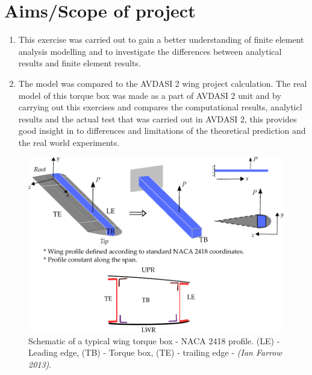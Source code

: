 \documentclass[11pt,a4paper,oneside]{memoir}
\begin{document}
\section{Aims/Scope of project}
\begin{enumerate}
	\item This exercise was carried out to gain a better understanding of finite element analysis modelling and to investigate the differences between analytical results and finite element results. 
	\item The model was compared to the AVDASI 2 wing project calculation. The real model of this torque box was made as a part of AVDASI 2 unit and by carrying out this exercises and compares the computational results, analyticl results and the actual test that was carried out in AVDASI 2, this provides  good insight in to differences and limitations of the theoretical prediction and the real world experiments.
\end{enumerate}
%


\begin{figure}
  \includegraphics[width=\textwidth]{ASD2-DBT-Wing-5-revised-2018.pdf}
  \caption{Schematic of a typical wing torque box - NACA 2418 profile. (LE) - Leading edge, (TB) - Torque box, (TE) - trailing edge  - \textit{(Ian Farrow 2013)}.}
  \label{fig:ASD2-DBT-Wing-5-revised}
\end{figure}
\end{document}
